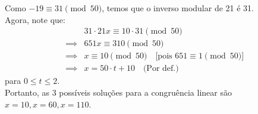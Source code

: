 Como $-19 \equiv 31 \pmod{50}$, temos que o inverso modular de 21 é 31. \\
Agora, note que:
\begin{align*}
	&31 \cdot 21x \equiv 10 \cdot 31 \pmod{50} \\ \implies 
	&651x \equiv 310 \pmod{50} \\ \implies 
	&x \equiv 10 \pmod{50} \quad \text{[pois $651 \equiv 1 \pmod{50}$]} \\ \implies
	&x = 50 \cdot t + 10 \quad \text{(Por def.)}
\end{align*}
para $0 \leq t \leq 2$. \\
Portanto, as 3 possíveis soluções para a congruência linear são $x = 10, x = 60, x= 110$.

